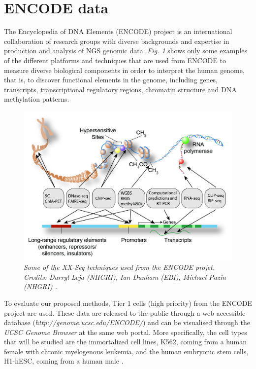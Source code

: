 \section{ENCODE data} \label{encode-data-sect}
The Encyclopedia of DNA Elements (ENCODE) project \citep{Dunham2012} is an international collaboration of research groups with diverse backgrounds and expertise in production and analysis of NGS genomic data. \emph{Fig. \ref{encode-seq-pic}} shows only some examples of the different platforms and techniques that are used from ENCODE to measure diverse biological components in order to interpret the human genome, that is, to discover functional elements in the genome, including genes, transcripts, transcriptional regulatory regions, chromatin structure and DNA methylation patterns.

\begin{figure}[!ht]
\begin{center}
 \includegraphics[scale = 0.25]{images/encode-seq.png}
\caption{\emph{Some of the XX-Seq techniques used from the ENCODE projet. Credits: Darryl Leja (NHGRI), Ian Dunham (EBI), Michael Pazin (NHGRI) \citep{Dunham2012}.}}
\label{encode-seq-pic}
\end{center}
\end{figure} 

To evaluate our proposed methods, Tier 1 cells (\ie high priority) from the ENCODE project are used. These data are released to the public through a web accessible database (\emph{http://genome.ucsc.edu/ENCODE/}) and can be visualised through the \emph{UCSC Genome Browser} at the same web portal. More specifically, the cell types that will be studied are the immortalized cell lines, K562, coming from a human female with chronic myelogenous leukemia, and the human embryonic stem cells, H1-hESC, coming from a human male \citep{Dunham2012}.

